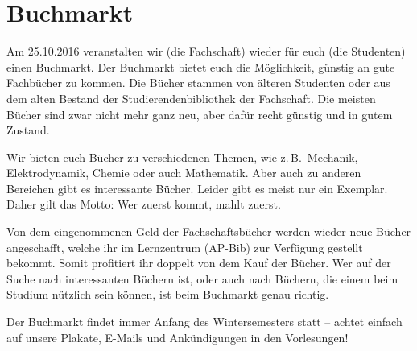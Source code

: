 \vspace{-6ex}
\section{Buchmarkt}
\vspace{-3ex}
\begin{multicols*}{2}
\begin{figure}
\end{figure}
Am 25.10.2016 veranstalten wir (die Fachschaft) wieder für euch (die Studenten) einen Buchmarkt.
Der Buchmarkt bietet euch die Möglichkeit, günstig an gute Fachbücher zu kommen.
Die Bücher stammen von älteren Studenten oder aus dem alten Bestand der Studierendenbibliothek der Fachschaft.
Die meisten Bücher sind zwar nicht mehr ganz neu, aber dafür recht günstig und in gutem Zustand.

Wir bieten euch Bücher zu verschiedenen Themen, wie z.\,B.\ Mechanik, Elektrodynamik, Chemie oder auch Mathematik.
Aber auch zu anderen Bereichen gibt es interessante Bücher.
Leider gibt es meist nur ein Exemplar.
Daher gilt das Motto: Wer zuerst kommt, mahlt zuerst.

Von dem eingenommenen Geld der Fachschaftsbücher werden wieder neue Bücher angeschafft, welche ihr im Lernzentrum (AP-Bib) zur Verfügung gestellt bekommt.
Somit profitiert ihr doppelt von dem Kauf der Bücher.
Wer auf der Suche nach interessanten Büchern ist, oder auch nach Büchern, die einem beim Studium nützlich sein können, ist beim Buchmarkt genau richtig.

Der Buchmarkt findet immer Anfang des Wintersemesters statt -- achtet einfach auf unsere Plakate, E-Mails und Ankündigungen in den Vorlesungen!

\end{multicols*}

